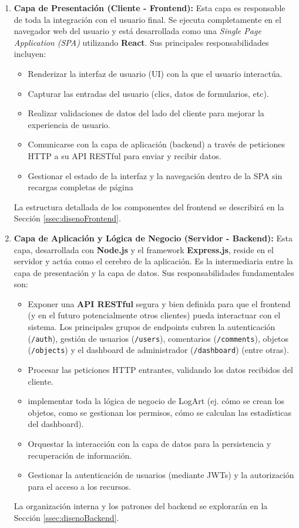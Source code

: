 \begin{enumerate}
    \item \textbf{Capa de Presentación (Cliente - Frontend):}
    Esta capa es responsable de toda la integración con el usuario final. Se ejecuta completamente en el navegador web del usuario y está desarrollada como una \textit{Single Page Application (SPA)} utilizando \textbf{React}. Sus principales responsabilidades incluyen:
    \begin{itemize}
        \item Renderizar la interfaz de usuario (UI) con la que el usuario interactúa.
        \item Capturar las entradas del usuario (clics, datos de formularios, etc).
        \item Realizar validaciones de datos del lado del cliente para mejorar la experiencia de usuario.
        \item Comunicarse con la capa de aplicación (backend) a través de peticiones HTTP a su API RESTful para enviar y recibir datos.
        \item Gestionar el estado de la interfaz y la navegación dentro de la SPA sin recargas completas de página
    \end{itemize}
    La estructura detallada de los componentes del frontend se describirá en la Sección \ref{ssec:disenoFrontend}.

    \item \textbf{Capa de Aplicación y Lógica de Negocio (Servidor - Backend):}
    Esta capa, desarrollada con \textbf{Node.js} y el framework \textbf{Express.js}, reside en el servidor y actúa como el cerebro de la aplicación. Es la intermediaria entre la capa de presentación y la capa de datos. Sus responsabilidades fundamentales son:
    \begin{itemize}
        \item Exponer una \textbf{API RESTful} segura y bien definida para que el frontend (y en el futuro potencialmente otros clientes) pueda interactuar con el sistema. Los principales grupos de endpoints cubren la autenticación (\texttt{/auth}), gestión de usuarios (\texttt{/users}), comentarios (\texttt{/comments}), objetos (\texttt{/objects}) y el dashboard de administrador (\texttt{/dashboard}) (entre otras).
        \item Procesar las peticiones HTTP entrantes, validando los datos recibidos del cliente.
        \item implementar toda la lógica de negocio de LogArt (ej. cómo se crean los objetos, como se gestionan los permisos, cómo se calculan las estadísticas del dashboard).
        \item Orquestar la interacción con la capa de datos para la persistencia y recuperación de información.
        \item Gestionar la autenticación de usuarios (mediante JWTs) y la autorización para el acceso a los recursos.
    \end{itemize}
    La organización interna y los patrones del backend se explorarán en la Sección \ref{ssec:disenoBackend}.


\end{enumerate}
